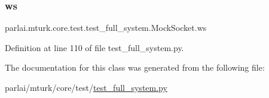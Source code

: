 \subsubsection{\texorpdfstring{ws}{ws}}
{\footnotesize\ttfamily parlai.\+mturk.\+core.\+test.\+test\+\_\+full\+\_\+system.\+Mock\+Socket.\+ws}



Definition at line 110 of file test\+\_\+full\+\_\+system.\+py.



The documentation for this class was generated from the following file\+:\begin{DoxyCompactItemize}
\item 
parlai/mturk/core/test/\hyperlink{test_2test__full__system_8py}{test\+\_\+full\+\_\+system.\+py}\end{DoxyCompactItemize}
